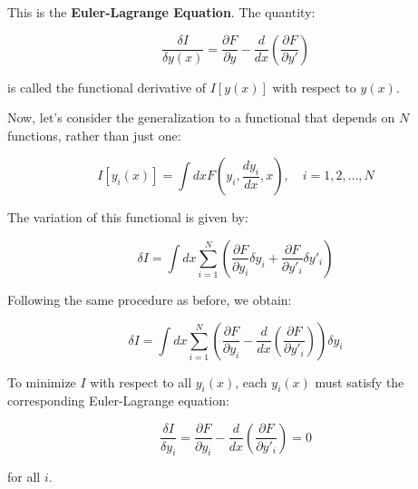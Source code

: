 This is the \textbf{Euler-Lagrange Equation}. The quantity:

\[
    \frac{\delta I}{\delta y(x)} = \frac{\partial F}{\partial y} - \frac{d}{dx} \left(\frac{\partial F}{\partial y'}\right)
\]

is called the functional derivative of $I[y(x)]$ with respect to $y(x)$.

Now, let's consider the generalization to a functional that depends on $N$ functions, 
rather than just one:

\[
    I[y_i(x)] = \int dx F(y_i, \frac{dy_i}{dx}, x), \quad i = 1, 2, \dots, N
\]

The variation of this functional is given by:

\[
    \delta I = \int dx \sum_{i=1}^{N} \left( \frac{\partial F}{\partial y_i} \delta y_i + \frac{\partial F}{\partial y'_i} \delta y'_i \right)
\]

Following the same procedure as before, we obtain:

\[
    \delta I = \int dx \sum_{i=1}^{N} \left( \frac{\partial F}{\partial y_i} - \frac{d}{dx} \left(\frac{\partial F}{\partial y'_i}\right) \right) \delta y_i
\]

To minimize $I$ with respect to all $y_i(x)$, each $y_i(x)$ must satisfy the 
corresponding Euler-Lagrange equation:

\[
    \frac{\delta I}{\delta y_i} = \frac{\partial F}{\partial y_i} - \frac{d}{dx} \left(\frac{\partial F}{\partial y'_i}\right) = 0
\]

for all $i$.